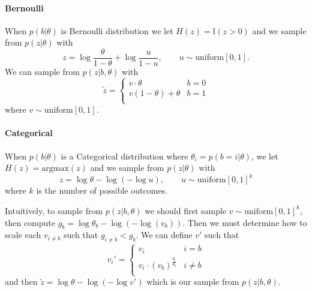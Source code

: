 \documentclass{article}
\begin{document}
\paragraph{Bernoulli} When $p(b|\theta)$ is Bernoulli distribution we let $H(z) = \mathbb{I}(z>0)$ and we sample from $p(z|\theta)$ with 
$$ z = \log \frac{\theta}{1 - \theta} + \log \frac{u}{1-u}, \qquad u \sim \text{uniform}[0,1].
$$ 
We can sample from $p(z|b, \theta)$ with 
\[
\tilde{z} =    \left\{
\begin{array}{ll}
      v\cdot\theta & b = 0 \\
      v(1-\theta) + \theta & b = 1 \\
\end{array} 
\right.
\]
where $v \sim \text{uniform}[0, 1]$.

\paragraph{Categorical} When $p(b|\theta)$ is a Categorical distribution where $\theta_i = p(b=i|\theta)$, we let $H(z) = \text{argmax}(z)$ and we sample from $p(z|\theta)$ with 
$$ z = \log\theta -\log(-\log u), \qquad u \sim \text{uniform}[0,1]^k
$$ where $k$ is the number of possible outcomes.

Intuitively, to sample from $p(z|b, \theta)$ we should first sample $v\sim \text{uniform}[0, 1]^k$, then compute $g_b = \log\theta_b -\log(-\log(v_b))$. Then we must determine how to scale each $v_{i\neq b}$ such that $g_{i\neq b} < g_b$. We can define $v'$ such that
\[
v_i' =    \left\{
\begin{array}{ll}
      v_i & i = b \\
      v_i\cdot(v_b)^{\frac{\theta_i}{\theta_b}} & i \neq b \\
\end{array} 
\right.
\] and then $\tilde{z} = \log\theta - \log(-\log v')$ which is our sample from $p(z|b, \theta)$. 

\end{document}
